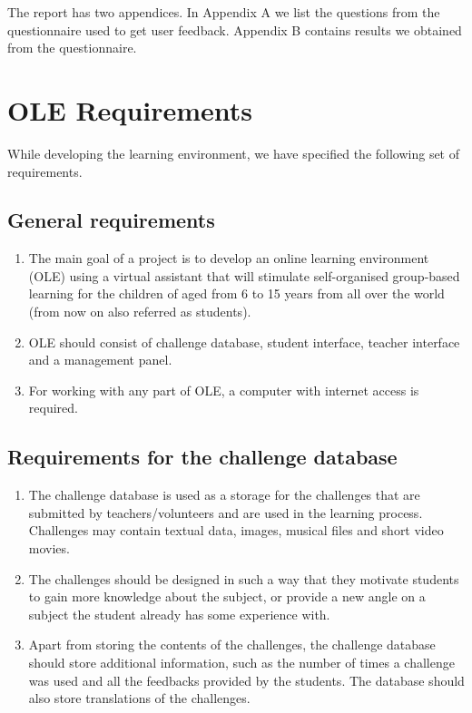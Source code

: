 \documentclass[a4paper]{article}
\begin{document}
The report has two appendices. In Appendix A we list the questions from the questionnaire used to get user feedback. Appendix B contains results we obtained from the questionnaire.

\section{OLE Requirements}

While developing the learning environment, we have specified the following set of requirements.

\subsection{General requirements}

\begin{enumerate}
\item The main goal of a project is to develop an online learning environment (OLE) using a virtual assistant that will stimulate self-organised group-based learning for the children of aged from 6 to 15 years from all over the world (from now on also referred as students).

\item OLE should consist of challenge database, student interface, teacher interface and a management panel.

\item For working with any part of OLE, a computer with internet access is required.
\end{enumerate}

\subsection{Requirements for the challenge database}

\begin{enumerate}
\item The challenge database is used as a storage for the challenges that are submitted by teachers/volunteers and are used in the learning process. Challenges may contain textual data, images, musical files and short video movies.

\item The challenges should be designed in such a way that they motivate students to gain more knowledge about the subject, or provide a new angle on a subject the student already has some experience with.

\item Apart from storing the contents of the challenges, the challenge database should store additional information, such as the number of times a challenge was used and all the feedbacks provided by the students. The database should also store translations of the challenges.
\end{enumerate}
\end{document}
